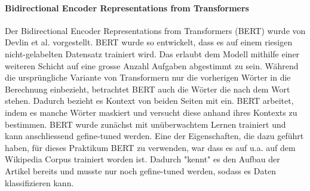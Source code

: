 \paragraph{Bidirectional Encoder Representations from Transformers}
Der Bidirectional Encoder Representations from Transformers (BERT) wurde von Devlin et al.  \cite{BERTReference} vorgestellt. BERT wurde so entwickelt, dass es auf einem riesigen nicht-gelabelten Datensatz trainiert wird. Das erlaubt dem Modell mithilfe einer weiteren Schicht auf eine grosse Anzahl Aufgaben abgestimmt zu sein. Während die ursprüngliche Variante von Transformern nur die vorherigen Wörter in die Berechnung einbezieht, betrachtet BERT auch die Wörter die nach dem Wort stehen. Dadurch bezieht es Kontext von beiden Seiten mit ein. BERT arbeitet, indem es manche Wörter maskiert und versucht diese anhand ihres Kontexts zu bestimmen. BERT wurde zunächst mit unüberwachtem Lernen trainiert und kann anschliessend gefine-tuned werden. Eine der Eigenschaften, die dazu geführt haben, für dieses Praktikum BERT zu verwenden, war dass es auf u.a. auf dem Wikipedia Corpus trainiert worden ist. Dadurch "kennt" es den Aufbau der Artikel bereits und musste nur noch gefine-tuned werden, sodass es Daten klassifizieren kann.